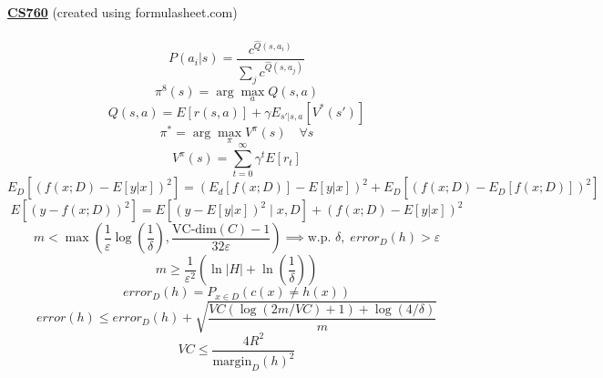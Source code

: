 \documentclass[10pt,fleqn]{minimal}
\begin{document}
 \pagestyle{empty}
{\normalsize { \color{textcolour}

\textbf{\underline{CS760}} \hspace{20pt}(created using formulasheet.com) \\ \\ 
\begin{equation}
	P(a_i|s) = \frac{c^{\hat{Q}(s,a_i)}}{\sum_j c^{\hat{Q}(s,a_j)}}
\end{equation}
\begin{equation}
	\pi^8 (s) = \arg \max_a Q(s,a)
\end{equation}
\begin{equation}
	Q(s,a) = E[r(s,a)] + \gamma E_{s'|s,a} [V^*(s')]
\end{equation}
\begin{equation}
	\pi^* = \arg \max_\pi V^\pi (s) \quad \forall s
\end{equation}
\begin{equation}
	V^{\pi} (s) = \sum_{t=0}^\infty \gamma^t E[r_t]
\end{equation}
\begin{equation}
	E_D \left[ \left( f(x;D) - E[y|x]\right)^2 \right] = \left( E_d[f(x;D)] - E[y|x]\right)^2 + E_D \left[ (f(x;D) - E_D[f(x;D)])^2\right]
\end{equation}
\begin{equation}
	E \left[  \left(y-f(x; D)\right)^2 \right] = E \left[  \left(y-E[y|x]\right)^2 \mid x,D \right] + \left( f(x;D) - E[y|x]\right)^2
\end{equation}
\begin{equation}
	m < \max \left( \frac{1}{\varepsilon} \log \left(\frac{1}{\delta}\right), \frac{\text{VC-dim}(C) -1}{32\varepsilon}\right) \implies \text{w.p. } \delta, \; error_D(h) > \varepsilon
\end{equation}
\begin{equation}
	m \geq \frac{1}{\varepsilon^2} \left( \ln |H| + \ln \left(\frac{1}{\delta} \right) \right)
\end{equation}
\begin{equation}
	error_{D}(h) = P_{x \in D} \left( c(x) \neq h(x)\right)
\end{equation}
\begin{equation}
	error(h) \leq error_D(h) + \sqrt{\frac{VC (\log(2m/VC) + 1) + \log(4/\delta)}{m}}
\end{equation}
\begin{equation}
	VC \leq \frac{4R^2}{\text{margin}_D(h)^2}
\end{equation}
}}
\end{document}
